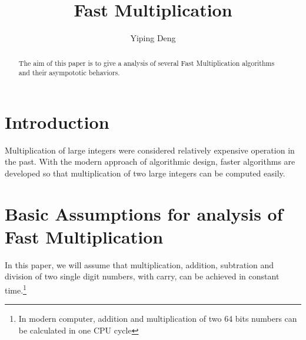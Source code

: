 \documentclass[12pt,a4paper]{amsart}
\numberwithin{equation}{section}
\theoremstyle{plain}
\theoremstyle{definition}
\begin{document}
\title{Fast Multiplication}

\author[Y. Deng]{Yiping Deng}

\address{P.O 182 College Ring 7, 28759 Bremen, Germany} 













\begin{abstract}
    The aim of this paper is to give a analysis of several Fast Multiplication
    algorithms and their asympototic behaviors.
\end{abstract}

\maketitle

\section{Introduction} Multiplication of large integers were
considered relatively expensive operation in the past. With the modern approach
of algorithmic design, faster algorithms are developed so that multiplication of
two large integers can be computed easily.

\section{Basic Assumptions for analysis of Fast Multiplication}
In this paper, we will assume that multiplication, addition, subtration and division of two single digit numbers, with carry, can be achieved
in constant time.\footnote{In modern computer, addition and multiplication of two 64 bits numbers
can be calculated in one CPU cycle}
\end{document}
